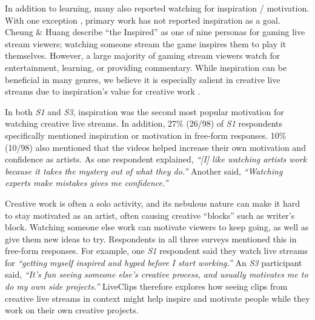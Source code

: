 In addition to learning, many also reported watching for inspiration / motivation. With one exception \cite{Cheung2011}, primary work has not reported inspiration as a goal. Cheung \& Huang \cite{Cheung2011} describe ``the Inspired'' as one of nine personas for gaming live stream viewers; watching someone stream the game inspires them to play it themselves. However, a large majority of gaming stream viewers watch for entertainment, learning, or providing commentary. While inspiration can be beneficial in many genres, we believe it is especially salient in creative live streams due to inspiration's value for creative work \cite{Herring2009}.

In both \textit{S1} and \textit{S3}, inspiration was the second most popular motivation for watching creative live streams. In addition, 27\% (26/98) of \textit{S1} respondents specifically mentioned inspiration or motivation in free-form responses. 10\% (10/98) also mentioned that the videos helped increase their own motivation and confidence as artists. As one respondent explained, \textit{``[I] like watching artists work because it takes the mystery out of what they do.''} Another said, \textit{``Watching experts make mistakes gives me confidence.''}

Creative work is often a solo activity, and its nebulous nature can make it hard to stay motivated as an artist, often causing creative ``blocks'' such as writer's block. Watching someone else work can motivate viewers to keep going, as well as give them new ideas to try. Respondents in all three surveys mentioned this in free-form responses. For example, one \textit{S1} respondent said they watch live streams for \textit{``getting myself inspired and hyped before I start working.''} An \textit{S3} participant said, \textit{``It's fun seeing someone else's creative process, and usually motivates me to do my own side projects.''} LiveClips therefore explores how seeing clips from creative live streams in context might help inspire and motivate people while they work on their own creative projects.






